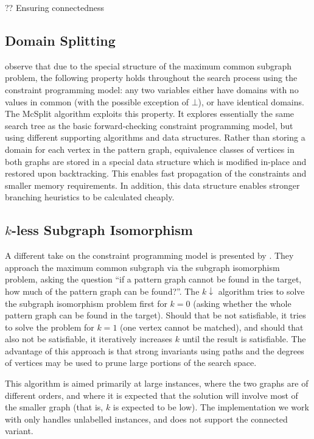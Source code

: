 \documentclass[sigconf]{acmart}
\begin{document}
?? Ensuring connectedness

\subsection{Domain Splitting}

\citet{o:McCreeshPT17} observe that due to the special structure of the maximum common subgraph
problem, the following property holds throughout the search process using the constraint programming
model: any two variables either have domains with no values in common (with the possible exception
of $\bot$), or have identical domains. The McSplit algorithm exploits this property. It explores
essentially the same search tree as the basic forward-checking constraint programming model, but
using different supporting algorithms and data structures.  Rather than storing a domain for each
vertex in the pattern graph, equivalence classes of vertices in both graphs are stored in a special
data structure which is modified in-place and restored upon backtracking. This enables fast
propagation of the constraints and smaller memory requirements. In addition, this data structure
enables stronger branching heuristics to be calculated cheaply.

\subsection{$k$-less Subgraph Isomorphism}

A different take on the constraint programming model is presented by
\citet{DBLP:conf/aaai/HoffmannMR17}. They approach the maximum common subgraph via the
subgraph isomorphism problem, asking the question ``if a pattern graph cannot be found in the
target, how much of the pattern graph can be found?''. The $k{\downarrow}$ algorithm tries to solve
the subgraph isomorphism problem first for $k=0$ (asking whether the whole pattern graph can be found in the
target). Should that be not satisfiable, it tries to solve the problem for $k=1$ (one vertex cannot
be matched), and should that also not be satisfiable, it iteratively increases $k$ until the result
is satisfiable. The advantage of this approach is that strong invariants using paths and the degrees
of vertices may be used to prune large portions of the search space.

This algorithm is aimed primarily at large instances, where the two graphs are of different orders,
and where it is expected that the solution will involve most of the smaller graph (that is, $k$ is
expected to be low). The implementation we work with only handles unlabelled instances, and does
not support the connected variant.
\end{document}

